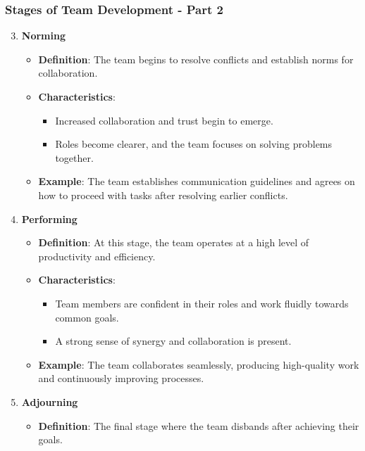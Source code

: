 \documentclass[aspectratio=169]{beamer}
\begin{document}
\begin{frame}[fragile]
    \frametitle{Stages of Team Development - Part 2}
    \begin{enumerate}
        \setcounter{enumi}{2}
        \item \textbf{Norming}
            \begin{itemize}
                \item \textbf{Definition}: The team begins to resolve conflicts and establish norms for collaboration.
                \item \textbf{Characteristics}:
                    \begin{itemize}
                        \item Increased collaboration and trust begin to emerge.
                        \item Roles become clearer, and the team focuses on solving problems together.
                    \end{itemize}
                \item \textbf{Example}: The team establishes communication guidelines and agrees on how to proceed with tasks after resolving earlier conflicts.
            \end{itemize}
        \item \textbf{Performing}
            \begin{itemize}
                \item \textbf{Definition}: At this stage, the team operates at a high level of productivity and efficiency.
                \item \textbf{Characteristics}:
                    \begin{itemize}
                        \item Team members are confident in their roles and work fluidly towards common goals.
                        \item A strong sense of synergy and collaboration is present.
                    \end{itemize}
                \item \textbf{Example}: The team collaborates seamlessly, producing high-quality work and continuously improving processes.
            \end{itemize}
        \item \textbf{Adjourning}
            \begin{itemize}
                \item \textbf{Definition}: The final stage where the team disbands after achieving their goals.

\end{itemize}
\end{enumerate}
\end{frame}
\end{document}
